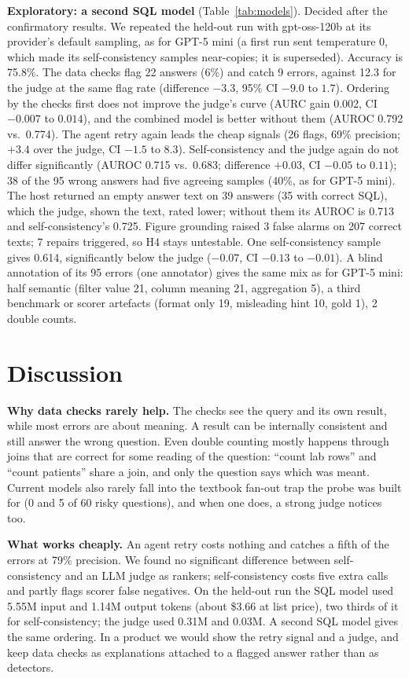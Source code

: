 \documentclass[conference]{IEEEtran}
\begin{document}
\textbf{Exploratory: a second SQL model} (Table~\ref{tab:models}). Decided after the confirmatory results. We repeated the
held-out run with gpt-oss-120b at its provider's default sampling, as for GPT-5 mini (a first run sent
temperature 0, which made its self-consistency samples near-copies; it is superseded). Accuracy is
75.8\%. The data checks flag 22 answers (6\%) and catch 9 errors, against 12.3 for the judge at the same
flag rate (difference $-3.3$, 95\% CI $-9.0$ to $1.7$). Ordering by the checks first does not improve
the judge's curve (AURC gain 0.002, CI $-0.007$ to $0.014$), and the combined model is better without
them (AUROC 0.792 vs.\ 0.774). The agent retry again leads the cheap signals (26 flags, 69\% precision;
$+3.4$ over the judge, CI $-1.5$ to $8.3$). Self-consistency and the judge again do not differ significantly
(AUROC 0.715 vs.\ 0.683; difference $+0.03$, CI $-0.05$ to $0.11$); 38 of the 95 wrong answers had five
agreeing samples (40\%, as for GPT-5 mini). The host returned an empty answer text on 39 answers (35
with correct SQL), which the judge, shown the text, rated lower; without them its AUROC is 0.713 and
self-consistency's 0.725. Figure grounding raised 3 false alarms on 207 correct texts; 7 repairs
triggered, so H4 stays untestable. One self-consistency sample gives 0.614, significantly below the
judge ($-0.07$, CI $-0.13$ to $-0.01$). A blind annotation of its 95 errors (one annotator) gives the
same mix as for GPT-5 mini: half semantic (filter value 21, column meaning 21, aggregation 5), a third
benchmark or scorer artefacts (format only 19, misleading hint 10, gold 1), 2 double counts.

\section{Discussion}

\textbf{Why data checks rarely help.} The checks see the query and its own result, while most errors
are about meaning. A result can be internally consistent and still answer the wrong question. Even
double counting mostly happens through joins that are correct for some reading of the question:
``count lab rows'' and ``count patients'' share a join, and only the question says which was meant. Current
models also rarely fall into the textbook fan-out trap the probe was built for (0 and 5 of 60 risky
questions), and when one does, a strong judge notices too.

\textbf{What works cheaply.} An agent retry costs nothing and catches a fifth of the errors at 79\%
precision. We found no significant difference between self-consistency and an LLM judge as rankers; self-consistency costs five extra
calls and partly flags scorer false negatives. On the held-out run the SQL model used 5.55M input and
1.14M output tokens (about \$3.66 at list price), two thirds of it for self-consistency; the judge used
0.31M and 0.03M. A second SQL model
gives the same ordering. In a product we would show the retry signal and a judge, and keep data checks as explanations
attached to a flagged answer rather than as detectors.
\end{document}
